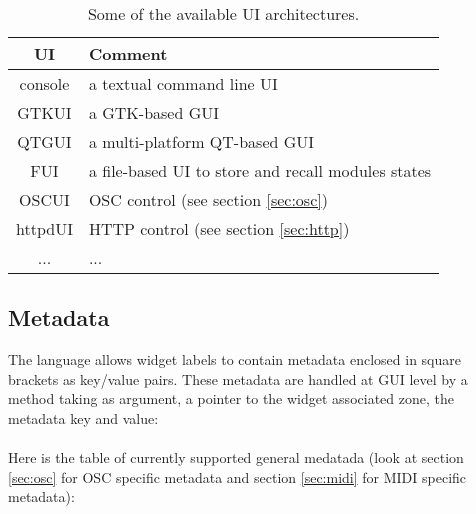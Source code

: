 \begin{table}[htp]
\begin{center}
\begin{tabular}{|c|l|}
\hline
\bf{UI} & \bf{Comment} \\
\hline
console & a textual command line UI \\
GTKUI & a GTK-based GUI \\
QTGUI & a multi-platform QT-based GUI \\
FUI & a file-based UI to store and recall modules states \\
OSCUI & OSC control (see section \ref{sec:osc}) \\
httpdUI & HTTP control (see section \ref{sec:http}) \\
...  & ... \\
\hline
\end{tabular}
\end{center}
\caption{Some of the available UI architectures.}
\label{tab:uiarch}
\end{table}%

\subsection{Metadata}
\label{sec:metadata}
The \faust language allows widget labels to contain metadata enclosed in square brackets as key/value pairs. These metadata are handled at GUI level by a  method taking as argument, a pointer to the widget associated zone, the metadata key and value: \\
\htab{} \\

Here is the table of currently supported general medatada (look at section \ref{sec:osc} for OSC specific metadata and section \ref{sec:midi} for MIDI specific metadata):

